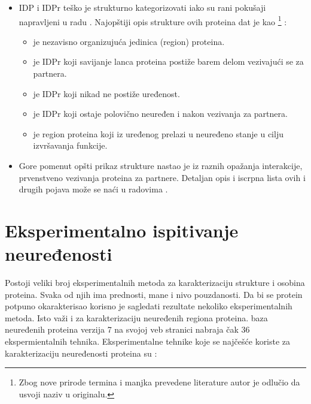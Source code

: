 \begin{itemize}
  \item 
    IDP i IDPr teško je strukturno kategorizovati \parencite{oldfield2014,
      dunker2001} iako su rani pokušaji napravljeni u radu \parencite{dunker2001}.
      Najopštiji opis strukture ovih proteina dat je kao
      \footnote{ Zbog nove
        prirode termina i manjka prevedene literature autor je odlučio da
      usvoji naziv u originalu.} \parencite{uversky2016}:
    \begin{itemize}
      \item {}  je nezavisno organizujuća jedinica (region) proteina.
      \item {}  je IDPr koji savijanje lanca proteina postiže barem delom vezivajući se za partnera. 
      \item {}  je IDPr koji nikad ne postiže uređenost.
      \item {}  je IDPr koji ostaje polovično neuređen i nakon vezivanja za partnera.
      \item {}  je region proteina koji iz uređenog prelazi u neuređeno stanje u cilju izvršavanja funkcije.
    \end{itemize}

  \item 
    Gore pomenut opšti prikaz strukture nastao je iz raznih opažanja
    interakcije, prvenstveno vezivanja proteina za partnere.
    Detaljan opis i iscrpna lista ovih i drugih pojava može se naći u radovima
    \cite{uversky2016, a2z,  Tompa2009}.

\end{itemize}

\section{Eksperimentalno ispitivanje neuređenosti}

Postoji veliki broj eksperimentalnih metoda za karakterizaciju strukture i
osobina proteina.  Svaka od njih ima prednosti, mane i nivo pouzdanosti. Da bi
se protein potpuno okarakterisao korisno je sagledati rezultate nekoliko
eksperimentalnih metoda. Isto važi i za karakterizaciju neuređenih regiona
proteina. \textit{} \cite{Piovesan2016} baza neuređenih
proteina verzija 7 na svojoj veb stranici nabraja čak 36 ekspermientalnih
tehnika.  Eksperimentalne tehnike koje se najčešće koriste za karakterizaciju
neuređenosti proteina su \cite{dunker2001}: 

